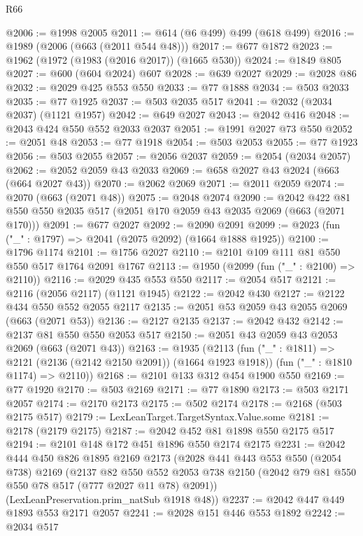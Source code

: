 \begin{lexlean}{R66}
\begin{coremodule}
@2006 := @1998 @2005
@2011 := @614 (@6 @499) @499 (@618 @499)
@2016 := @1989 (@2006 (@663 (@2011 @544 @48)))
@2017 := @677 @1872
@2023 := @1962 (@1972 (@1983 (@2016 @2017)) (@1665 @530))
@2024 := @1849 @805
@2027 := @600 (@604 @2024) @607
@2028 := @639 @2027
@2029 := @2028 @86
@2032 := @2029 @425 @553 @550
@2033 := @77 @1888
@2034 := @503 @2033
@2035 := @77 @1925
@2037 := @503 @2035 @517
@2041 := @2032 (@2034 @2037) (@1121 @1957)
@2042 := @649 @2027
@2043 := @2042 @416
@2048 := @2043 @424 @550 @552 @2033 @2037
@2051 := @1991 @2027 @73 @550
@2052 := @2051 @48
@2053 := @77 @1918
@2054 := @503 @2053
@2055 := @77 @1923
@2056 := @503 @2055
@2057 := @2056 @2037
@2059 := @2054 (@2034 @2057)
@2062 := @2052 @2059 @43 @2033
@2069 := @658 @2027 @43 @2024 (@663 (@664 @2027 @43))
@2070 := @2062 @2069
@2071 := @2011 @2059
@2074 := @2070 (@663 (@2071 @48))
@2075 := @2048 @2074
@2090 := @2042 @422 @81 @550 @550 @2035 @517 (@2051 @170 @2059 @43 @2035 @2069 (@663 (@2071 @170)))
@2091 := @677 @2027
@2092 := @2090 @2091
@2099 := @2023 (fun ("_" : @1797) => @2041 (@2075 @2092) (@1664 @1888 @1925))
@2100 := @1796 @1174
@2101 := @1756 @2027
@2110 := @2101 @109 @111 @81 @550 @550 @517 @1764 @2091 @1767
@2113 := @1950 (@2099 (fun ("_" : @2100) => @2110))
@2116 := @2029 @435 @553 @550
@2117 := @2054 @517
@2121 := @2116 (@2056 @2117) (@1121 @1945)
@2122 := @2042 @430
@2127 := @2122 @434 @550 @552 @2055 @2117
@2135 := @2051 @53 @2059 @43 @2055 @2069 (@663 (@2071 @53))
@2136 := @2127 @2135
@2137 := @2042 @432
@2142 := @2137 @81 @550 @550 @2053 @517
@2150 := @2051 @43 @2059 @43 @2053 @2069 (@663 (@2071 @43))
@2163 := @1935
    (@2113
      (fun ("_" : @1811) => @2121 (@2136 (@2142 @2150 @2091)) (@1664 @1923 @1918))
      (fun ("_" : @1810 @1174) => @2110))
@2168 := @2101 @133 @312 @454 @1900 @550
@2169 := @77 @1920
@2170 := @503 @2169
@2171 := @77 @1890
@2173 := @503 @2171 @2057
@2174 := @2170 @2173
@2175 := @502 @2174
@2178 := @2168 (@503 @2175 @517)
@2179 := LexLeanTarget.TargetSyntax.Value.some
@2181 := @2178 (@2179 @2175)
@2187 := @2042 @452 @81 @1898 @550 @2175 @517
@2194 := @2101 @148 @172 @451 @1896 @550 @2174 @2175
@2231 := @2042
    @444
    @450
    @826
    @1895
    @2169
    @2173
    (@2028
      @441
      @443
      @553
      @550
      (@2054 @738)
      @2169
      (@2137
        @82
        @550
        @552
        @2053
        @738
        @2150
        (@2042 @79 @81 @550 @550 @78 @517 (@777 @2027 @11 @78) @2091))
      (LexLeanPreservation.prim_natSub @1918 @48))
@2237 := @2042 @447 @449 @1893 @553 @2171 @2057
@2241 := @2028 @151 @446 @553 @1892
@2242 := @2034 @517

\end{coremodule}
\end{lexlean}
